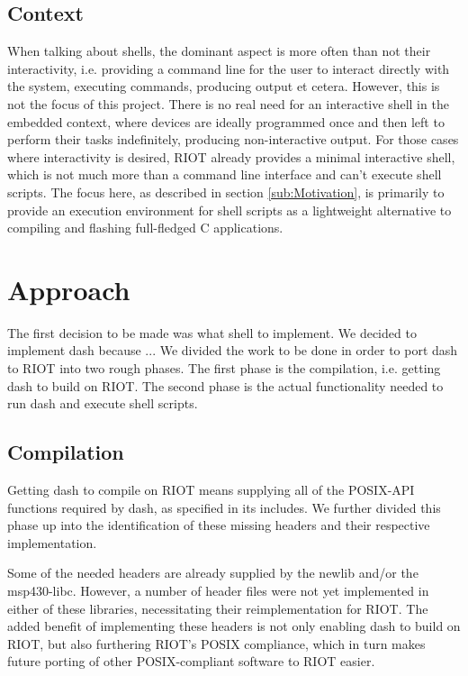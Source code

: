 \documentclass[conference]{IEEEtran}
\begin{document}
\subsection{Context}
\label{sub:Context}
When talking about shells, the dominant aspect is more often than not
their interactivity, i.e. providing a command line for the user to
interact directly with the system, executing commands, producing output
et cetera. However, this is not the focus of this project. There is no
real need for an interactive shell in the embedded context, where
devices are ideally programmed once and then left to perform their tasks
indefinitely, producing non-interactive output. For those cases where
interactivity is desired, RIOT already provides a minimal interactive
shell, which is not much more than a command line interface and can't
execute shell scripts. The focus here, as described in section
\ref{sub:Motivation}, is primarily to provide an execution environment
for shell scripts as a lightweight alternative to compiling and flashing
full-fledged C applications.

\section{Approach}
\label{sec:Approach}
The first decision to be made was what shell to implement. We decided to
implement dash because ...
We divided the work to be done in order to port dash to RIOT into two
rough phases. The first phase is the compilation, i.e. getting dash to
build on RIOT. The second phase is the actual functionality needed to
run dash and execute shell scripts.

\subsection{Compilation}
\label{sub:Compilation}
Getting dash to compile on RIOT means supplying all of the POSIX-API
functions required by dash, as specified in its includes. We further
divided this phase up into the identification of these missing headers
and their respective implementation.

Some of the needed headers are already supplied by the newlib and/or the
msp430-libc. However, a number of header files were not yet implemented
in either of these libraries, necessitating their reimplementation for
RIOT. The added benefit of implementing these headers is not only
enabling dash to build on RIOT, but also furthering RIOT's POSIX
compliance, which in turn makes future porting of other POSIX-compliant
software to RIOT easier.
\end{document}
